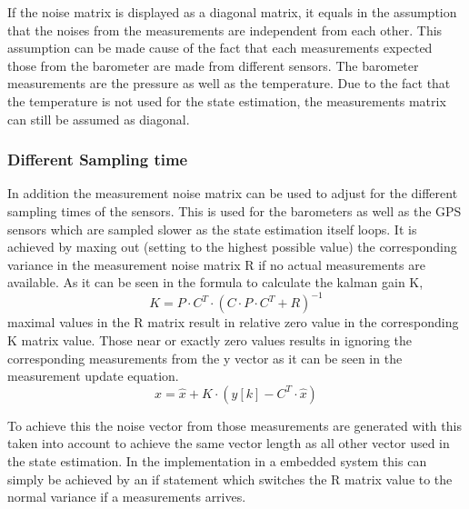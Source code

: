 If the noise matrix is displayed as a diagonal matrix, 
it equals in the assumption that the noises from the measurements are independent from each other.
This assumption can be made cause of the fact that each measurements expected those from the barometer are made from different sensors.
The barometer measurements are the pressure as well as the temperature.
Due to the fact that the temperature is not used for the state estimation, the measurements matrix can still be assumed as diagonal.

\subsubsection{Different Sampling time}
In addition the measurement noise matrix can be used to adjust for the different sampling times of the sensors.
This is used for the barometers as well as the GPS sensors which are sampled slower as the state estimation itself loops.
It is achieved by maxing out (setting to the highest possible value) the corresponding variance in the measurement noise matrix R if no actual measurements are available.
As it can be seen in the formula to calculate the kalman gain K, 
$$  K = P\cdot C^T\cdot (C\cdot P\cdot C^T + R)^{-1} $$
maximal values in the R matrix result in relative zero value in the corresponding K matrix value.
Those near or exactly zero values results in ignoring the corresponding measurements from the y vector as it can be seen in the measurement update equation.
$$  x = \hat{x} + K\cdot(y[k] - C^T \cdot \hat{x}) $$

To achieve this the noise vector from those measurements are generated with this taken into account to achieve the same vector length as all other vector used in the state estimation.
In the implementation in a embedded system this can simply be achieved by an if statement which switches the R matrix value to the normal variance if a measurements arrives.


